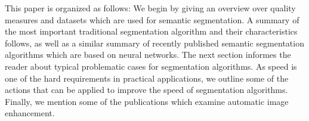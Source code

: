 This paper is organized as follows: We begin by giving an overview over quality
measures and datasets which are used for semantic segmentation. A summary of
the most important traditional segmentation algorithm and their characteristics
follows, as well as a similar summary of recently published semantic
segmentation algorithms which are based on neural networks. The next section
informes the reader about typical problematic cases for segmentation
algorithms. As speed is one of the hard requirements in practical applications,
we outline some of the actions that can be applied to improve the speed of
segmentation algorithms. Finally, we mention some of the publications which
examine automatic image enhancement.
